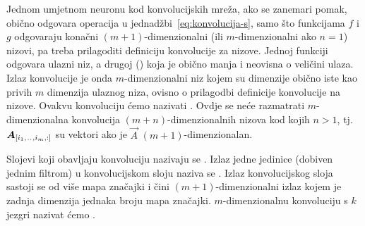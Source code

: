 \documentclass[utf8, diplomski, lmodern]{fer}
\begin{document}
Jednom umjetnom neuronu kod konvolucijskih mreža, ako se zanemari pomak, obično odgovara operacija u jednadžbi~\eqref{eq:konvolucija-s}, samo što funkcijama $f$ i $g$ odgovaraju konačni $(m+1)$-dimenzionalni (ili $m$-dimenzionalni ako $n=1$) nizovi, pa treba prilagoditi definiciju konvolucije za nizove. Jednoj funkciji odgovara ulazni niz, a drugoj  () koja je obično manja i neovisna o veličini ulaza. Izlaz konvolucije je onda $m$-dimenzionalni niz kojem su dimenzije obično iste kao privih $m$ dimenzija ulaznog niza, ovisno o prilagodbi definicije konvolucije na nizove. Ovakvu konvoluciju ćemo nazivati . Ovdje se neće razmatrati $m$-dimenzionalna konvolucija $(m+n)$-dimenzionalnih nizova kod kojih $n>1$, tj. $\vec A_\ind{i_1,\bidot,i_m,:}$ su vektori ako je $\vec A$ $(m+1)$-dimenzionalan.

Slojevi koji obavljaju konvoluciju nazivaju se . Izlaz jedne jedinice (dobiven jednim filtrom) u konvolucijskom sloju naziva se . Izlaz konvolucijskog sloja sastoji se od više mapa značajki i čini $(m+1)$-dimenzionalni izlaz kojem je zadnja dimenzija jednaka broju mapa značajki. $m$-dimenzionalnu konvoluciju s $k$ jezgri nazivat ćemo .
\end{document}
